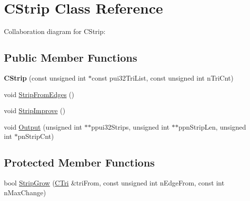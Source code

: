 \hypertarget{class_c_strip}{\section{C\+Strip Class Reference}
\label{class_c_strip}
}


Collaboration diagram for C\+Strip\+:
\subsection*{Public Member Functions}
\begin{DoxyCompactItemize}
\item 
\hypertarget{class_c_strip_a1b9005a60eea272c107afef5663ffd60}{{\bfseries C\+Strip} (const unsigned int $\ast$const pui32\+Tri\+List, const unsigned int n\+Tri\+Cnt)}\label{class_c_strip_a1b9005a60eea272c107afef5663ffd60}

\item 
void \hyperlink{class_c_strip_af80cd2f5d3a943127c34dd6af9751ee3}{Strip\+From\+Edges} ()
\item 
void \hyperlink{class_c_strip_a3e833c14ef1f84a278d8141f78740519}{Strip\+Improve} ()
\item 
void \hyperlink{class_c_strip_abbdfae7e0e99ec424dadb298d7444f32}{Output} (unsigned int $\ast$$\ast$ppui32\+Strips, unsigned int $\ast$$\ast$ppn\+Strip\+Len, unsigned int $\ast$pn\+Strip\+Cnt)
\end{DoxyCompactItemize}
\subsection*{Protected Member Functions}
\begin{DoxyCompactItemize}
\item 
bool \hyperlink{class_c_strip_ab63dd8a0b984134e4db1aa10111e743f}{Strip\+Grow} (\hyperlink{class_c_tri}{C\+Tri} \&tri\+From, const unsigned int n\+Edge\+From, const int n\+Max\+Change)
\end{DoxyCompactItemize}
